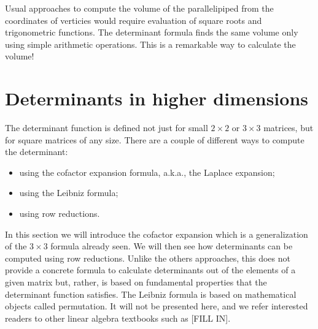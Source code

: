 \documentclass{ximera}
\begin{document}
Usual approaches to compute the volume of the parallelipiped from the
coordinates of verticies would require evaluation of square roots and
trigonometric functions. The determinant formula finds the same volume
only using simple arithmetic operations. This is a remarkable way to
calculate the volume!


\section{Determinants in higher dimensions}
The determinant function is defined not just for small
$2 \times 2$ or $3 \times 3$ matrices, but for square matrices of any
size. There are a couple of different ways to compute the determinant:
\begin{itemize}
\item using the cofactor expansion formula, a.k.a., the Laplace expansion;
\item using the Leibniz formula;
\item using row reductions.
\end{itemize}
In this section we will introduce the cofactor expansion which is a
generalization of the $3 \times 3$ formula already seen. We will then see
how determinants can be computed using row reductions. Unlike the
others approaches, this does not provide a concrete formula to
calculate determinants out of the elements of a given matrix but,
rather, is based on fundamental properties that the determinant
function satisfies. The Leibniz formula is based on mathematical
objects called permutation. It will not be presented here, and we
refer interested readers to other linear algebra textbooks such as
[FILL IN].
\end{document}
